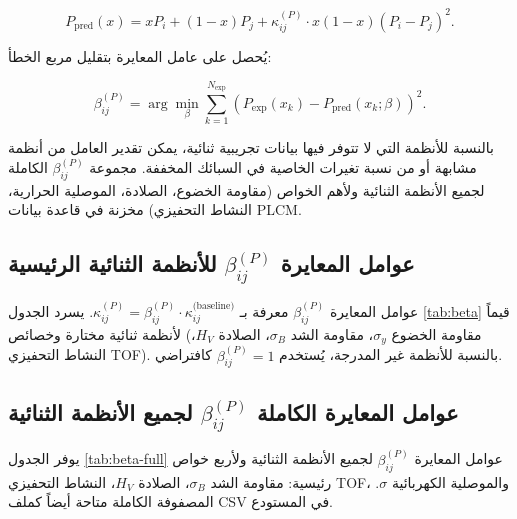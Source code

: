 \documentclass[11pt,a4paper]{article}
\begin{document}
\begin{otherlanguage}{arabic}
		\begin{equation}
			P_{\text{pred}}(x) = x P_i + (1-x) P_j + \kappa_{ij}^{(P)} \cdot x(1-x) (P_i - P_j)^2.
			\label{eq:binary-prediction}
		\end{equation}
		
		يُحصل على عامل المعايرة بتقليل مربع الخطأ:
		
		\begin{equation}
			\beta_{ij}^{(P)} = \arg\min_{\beta} \sum_{k=1}^{N_{\text{exp}}} \left( P_{\text{exp}}(x_k) - P_{\text{pred}}(x_k;\beta) \right)^2.
			\label{eq:beta-optimization}
		\end{equation}
		
		بالنسبة للأنظمة التي لا تتوفر فيها بيانات تجريبية ثنائية، يمكن تقدير العامل من أنظمة مشابهة أو من نسبة تغيرات الخاصية في السبائك المخففة. مجموعة \(\beta_{ij}^{(P)}\) الكاملة لجميع الأنظمة الثنائية ولأهم الخواص (مقاومة الخضوع، الصلادة، الموصلية الحرارية، النشاط التحفيزي) مخزنة في قاعدة بيانات PLCM.
		
		\subsection{عوامل المعايرة \(\beta_{ij}^{(P)}\) للأنظمة الثنائية الرئيسية}
		\label{subsec:beta-table}
		
		عوامل المعايرة \(\beta_{ij}^{(P)}\) معرفة بـ \(\kappa_{ij}^{(P)} = \beta_{ij}^{(P)} \cdot \kappa_{ij}^{\text{(baseline)}}\). يسرد الجدول \ref{tab:beta} قيماً لأنظمة ثنائية مختارة وخصائص (مقاومة الخضوع \(\sigma_y\)، مقاومة الشد \(\sigma_B\)، الصلادة \(H_V\)، النشاط التحفيزي TOF). بالنسبة للأنظمة غير المدرجة، يُستخدم \(\beta_{ij}^{(P)} = 1\) كافتراضي.
		
		\subsection{عوامل المعايرة الكاملة \(\beta_{ij}^{(P)}\) لجميع الأنظمة الثنائية}
		\label{subsec:beta-full}
		
		يوفر الجدول \ref{tab:beta-full} عوامل المعايرة \(\beta_{ij}^{(P)}\) لجميع الأنظمة الثنائية ولأربع خواص رئيسية: مقاومة الشد \(\sigma_B\)، الصلادة \(H_V\)، النشاط التحفيزي TOF، والموصلية الكهربائية \(\sigma\). المصفوفة الكاملة متاحة أيضاً كملف CSV في المستودع.
		

\end{otherlanguage}
\end{document}
